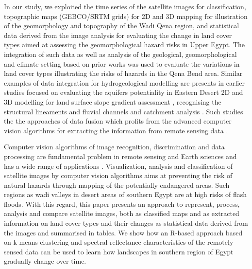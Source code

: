 \documentclass[information,article,submit,pdftex,moreauthors]{Definitions/mdpi}
\begin{document}
In our study, we exploited the time series of the satellite images for classification, topographic maps (GEBCO/SRTM grids) for 2D and 3D mapping for illustration of the geomorphology and topography of the Wadi Qena region, and statistical data derived from the image analysis for evaluating the change in land cover types aimed at assessing the geomorphological hazard risks in Upper Egypt. The integration of such data as well as analysis of the geological, geomorphological and climate setting based on prior works was used to evaluate the variations in land cover types illustrating the risks of hazards in the Qena Bend area. Similar examples of data integration for hydrogeological modelling are presents in earlier studies focused on evaluating the aquifers potentiality in Eastern Desert \cite{Moneim,ELHAMEED2017218} 2D and 3D modelling for land surface slope gradient assessment \cite{Othman}, recognising the structural lineaments and fluvial channels and catchment analysis \cite{rs12101559}. Such studies the the approaches of data fusion which profits from the advanced computer vision algorithms for extracting the information from remote sensing data \cite{AZZAZY2022104805}.

Computer vision algorithms of image recognition, discrimination and data processing are fundamental problem in remote sensing and Earth sciences and has a wide range of applications \cite{ABDELKAREEM2015245,Lemenkova202231,ELQADI2020104696,Husseinetal1995,DHANYA2022211}. Visualization, analysis and classification of satellite images by computer vision algorithms aims at preventing the risk of natural hazards through mapping of the potentially endangered areas. Such regions as wadi valleys in desert areas of southern Egypt are at high risks of flash floods. With this regard, this paper presents an approach to represent, process, analysis and compare satellite images, both as classified maps and as extracted information on land cover types and their changes as statistical data derived from the images and summarised in tables. We show how an R-based approach based on k-means clustering and spectral reflectance characteristics of the remotely sensed data can be used to learn how landscapes in southern region of Egypt gradually change over time. 
\end{document}
